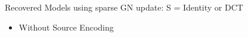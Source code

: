 \documentclass[12pt]{beamer}
\begin{document}
\begin{frame}{Recovered Models using sparse GN update: S = Identity or DCT }
\begin{itemize}
  \item Without Source Encoding
\end{itemize}
\begin{figure}

\end{figure}

\end{frame}
\end{document}
